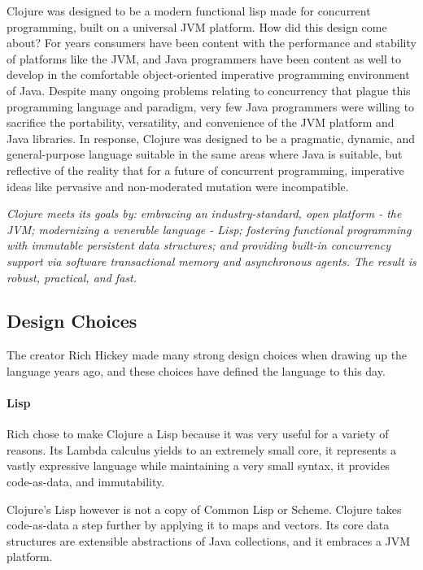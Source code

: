     Clojure was designed to be a modern functional lisp made for concurrent programming, built on a universal JVM platform. How did this design come about? For years consumers have been content with the performance and stability of platforms like the JVM, and Java programmers have been content as well to develop in the comfortable object-oriented imperative programming environment of Java. Despite many ongoing problems relating to concurrency that plague this programming language and paradigm, very few Java programmers were willing to sacrifice the portability, versatility, and convenience of the JVM platform and Java libraries. In response, Clojure was designed to be a pragmatic, dynamic, and general-purpose language suitable in the same areas where Java is suitable, but reflective of the reality that for a future of concurrent programming, imperative ideas like pervasive and non-moderated mutation were incompatible.
    
    \textit{Clojure meets its goals by: embracing an industry-standard, open platform - the JVM; modernizing a venerable language - Lisp; fostering functional programming with immutable persistent data structures; and providing built-in concurrency support via software transactional memory and asynchronous agents. The result is robust, practical, and fast.}
    \cite{clojure_website:rationale}
     
\subsection{Design Choices}

    The creator Rich Hickey made many strong design choices when drawing up the language years ago, and these choices have defined the language to this day.
    
    \paragraph{Lisp}
     Rich chose to make Clojure a Lisp because it was very useful for a variety of reasons. Its Lambda calculus yields to an extremely small core, it represents a vastly expressive language while maintaining a very small syntax, it provides code-as-data, and immutability.
     
     Clojure's Lisp however is not a copy of Common Lisp or Scheme. Clojure takes code-as-data a step further by applying it to maps and vectors. Its core data structures are extensible abstractions of Java collections, and it embraces a JVM platform.
    
